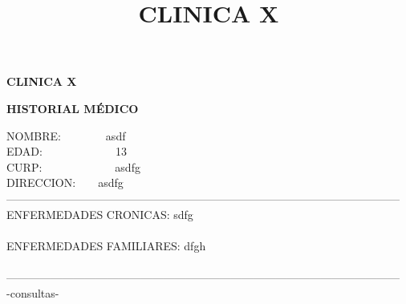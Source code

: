 \documentclass[10pt,a4paper]{letter}
\title{\bf CLINICA X}
\begin{document}
\begin{center}
{\scshape\LARGE \bf CLINICA X\par}
{\bf HISTORIAL MÉDICO\\}
\end{center}
NOMBRE:\ \ \ \ \ \ \ \ asdf\\
EDAD:\ \ \ \ \ \ \ \ \ \ \ \ \ 13\\
CURP:\ \ \ \ \ \ \ \ \ \ \ \ \ asdfg \\
DIRECCION:\ \ \ \ asdfg\\
--------------------------------------------------------------------------------------------------------- \\
ENFERMEDADES CRONICAS: sdfg\\ \\
ENFERMEDADES FAMILIARES: dfgh \\ \\
--------------------------------------------------------------------------------------------------------- \\
-consultas-
\end{document}
